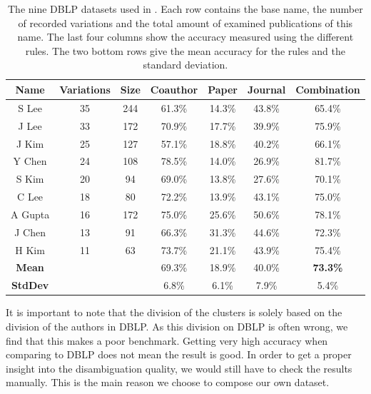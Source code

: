 \begin{table}
	\centering
		\begin{tabular}[ht]{|c||c|c|c|c|c|c|}
			\hline
			\bfseries{Name} & \bfseries{Variations} & \bfseries{Size} & \bfseries{Coauthor} & \bfseries{Paper} & \bfseries{Journal} & \bfseries{Combination} \\
			\hline
			S Lee & 35 & 244 & 61.3\% & 14.3\% & 43.8\% & 65.4\% \\
			\hline
			J Lee & 33 & 172 & 70.9\% & 17.7\% & 39.9\% & 75.9\% \\
			\hline
			J Kim & 25 & 127 & 57.1\% & 18.8\% & 40.2\% & 66.1\% \\
			\hline
			Y Chen & 24 & 108 & 78.5\% & 14.0\% & 26.9\% & 81.7\% \\
			\hline
			S Kim & 20 & 94 & 69.0\% & 13.8\% & 27.6\% & 70.1\% \\
			\hline
			C Lee & 18 & 80 & 72.2\% & 13.9\% & 43.1\% & 75.0\% \\
			\hline
			A Gupta & 16 & 172 & 75.0\% & 25.6\% & 50.6\% & 78.1\% \\
			\hline
			J Chen & 13 & 91 & 66.3\% & 31.3\% & 44.6\% & 72.3\% \\
			\hline
			H Kim & 11 & 63 & 73.7\% & 21.1\% & 43.9\% & 75.4\% \\
			\hline
			\hline
			\bfseries{Mean} & & & 69.3\% & 18.9\% & 40.0\% & \bfseries{73.3\%} \\
			\hline
			\bfseries{StdDev} & & & 6.8\% & 6.1\% & 7.9\% & 5.4\% \\
			\hline
		\end{tabular}
	\caption{The nine DBLP datasets used in \cite{han2004two}. Each row contains the base name, the number of recorded variations and the total amount of examined publications of this name. The last four columns show the accuracy measured using the different rules. The two bottom rows give the mean accuracy for the rules and the standard deviation.}
	\label{tab:auth-dblp-dataset}
\end{table}

It is important to note that the division of the clusters is solely based on the division of the authors in DBLP. As this division on DBLP is often wrong, we find that this makes a poor benchmark. Getting very high accuracy when comparing to DBLP does not mean the result is good. In order to get a proper insight into the disambiguation quality, we would still have to check the results manually. This is the main reason we choose to compose our own dataset.

